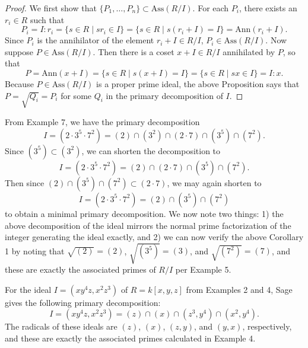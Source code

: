 \documentclass[12pt]{article}
\newenvironment{example}[2][Example]{\begin{trivlist}
\item[\hskip \labelsep {\bfseries #1}\hskip \labelsep {\bfseries #2.}]}{\end{trivlist}}
\newcommand{\ass}{\text{Ass}}
\newcommand{\ann}{\text{Ann}}
\begin{document}
\begin{proof}
	We first show that $\{P_1, \dots, P_n\} \subset \ass(R/I)$. For each $P_i$, there exists an $r_i \in R$ such that \[ P_i = I: r_i = \{ s \in R \mid sr_i \in I \} = \{s \in R \mid s(r_i + I) = I\} = \ann(r_i + I). \] Since $P_i$ is the annihilator of the element $r_i + I \in R/I$, $P_i \in \ass(R/I)$. Now suppose $P \in \ass(R/I)$. Then there is a coset $x + I \in R/I$ annihilated by $P$, so that \[ P = \ann(x + I) = \{s \in R \mid s(x + I) = I\} = \{s \in R \mid sx \in I\} = I:x. \] Because $P \in \ass(R/I)$ is a proper prime ideal, the above Proposition says that $P = \sqrt{Q_i} = P_i$ for some $Q_i$ in the primary decomposition of $I$.
\end{proof}


\begin{example}{8}
	From Example 7, we have the primary decomposition \[ I = (2 \cdot 3^5 \cdot 7^2) = (2) \cap (3^2) \cap (2 \cdot 7) \cap (3^5) \cap (7^2). \] Since $(3^5) \subset (3^2)$, we can shorten the decomposition to \[ I = (2 \cdot 3^5 \cdot 7^2) = (2) \cap (2 \cdot 7) \cap (3^5) \cap (7^2). \] Then since $(2) \cap (3^5) \cap (7^2) \subset (2 \cdot 7)$, we may again shorten to \[ I = (2 \cdot 3^5 \cdot 7^2) = (2) \cap (3^5) \cap (7^2) \] to obtain a minimal primary decomposition. We now note two things: 1) the above decomposition of the ideal mirrors the normal prime factorization of the integer generating the ideal exactly, and 2) we can now verify the above Corollary 1 by noting that $\sqrt{(2)} = (2)$, $\sqrt{(3^5)} = (3)$, and $\sqrt{(7^2)} = (7)$, and these are exactly the associated primes of $R/I$ per Example 5.
\end{example}


\begin{example}{9}
	For the ideal $I = (xy^4z, x^2z^3)$ of $R = k[x,y,z]$ from Examples 2 and 4, Sage gives the following primary decomposition: \[ I = (xy^4z, x^2z^3) = (z) \cap (x) \cap (z^3,y^4) \cap (x^2,y^4). \] The radicals of these ideals are $(z)$, $(x)$, $(z,y)$, and $(y,x)$, respectively, and these are exactly the associated primes calculated in Example 4.
\end{example}








\newpage


\end{document}
